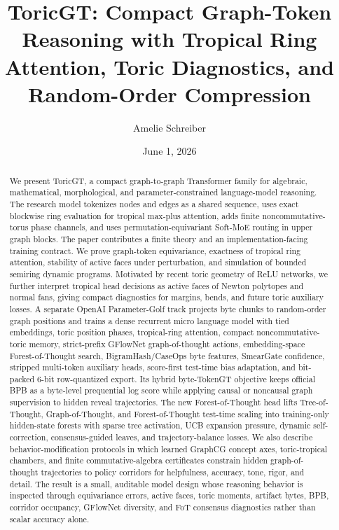 \documentclass[10pt]{article}
\title{\vspace{-1.4em}ToricGT: Compact Graph-Token Reasoning with Tropical Ring Attention, Toric Diagnostics, and Random-Order Compression}
\author{Amelie Schreiber}
\date{June 1, 2026}
\theoremstyle{definition}
\theoremstyle{plain}
\theoremstyle{remark}
\begin{document}
\maketitle

\begin{abstract}
We present ToricGT, a compact graph-to-graph Transformer family for algebraic, mathematical, morphological, and parameter-constrained language-model reasoning.  The research model tokenizes nodes and edges as a shared sequence, uses exact blockwise ring evaluation for tropical max-plus attention, adds finite noncommutative-torus phase channels, and uses permutation-equivariant Soft-MoE routing in upper graph blocks.  The paper contributes a finite theory and an implementation-facing training contract.  We prove graph-token equivariance, exactness of tropical ring attention, stability of active faces under perturbation, and simulation of bounded semiring dynamic programs.  Motivated by recent toric geometry of ReLU networks, we further interpret tropical head decisions as active faces of Newton polytopes and normal fans, giving compact diagnostics for margins, bends, and future toric auxiliary losses.  A separate OpenAI Parameter-Golf track projects byte chunks to random-order graph positions and trains a dense recurrent micro language model with tied embeddings, toric position phases, tropical-ring attention, compact noncommutative-toric memory, strict-prefix GFlowNet graph-of-thought actions, embedding-space Forest-of-Thought search, BigramHash/CaseOps byte features, SmearGate confidence, stripped multi-token auxiliary heads, score-first test-time bias adaptation, and bit-packed 6-bit row-quantized export.  Its hybrid byte-TokenGT objective keeps official BPB as a byte-level prequential log score while applying causal or noncausal graph supervision to hidden reveal trajectories.  The new Forest-of-Thought head lifts Tree-of-Thought, Graph-of-Thought, and Forest-of-Thought test-time scaling into training-only hidden-state forests with sparse tree activation, UCB expansion pressure, dynamic self-correction, consensus-guided leaves, and trajectory-balance losses.  We also describe behavior-modification protocols in which learned GraphCG concept axes, toric-tropical chambers, and finite commutative-algebra certificates constrain hidden graph-of-thought trajectories to policy corridors for helpfulness, accuracy, tone, rigor, and detail.  The result is a small, auditable model design whose reasoning behavior is inspected through equivariance errors, active faces, toric moments, artifact bytes, BPB, corridor occupancy, GFlowNet diversity, and FoT consensus diagnostics rather than scalar accuracy alone.
\end{abstract}
\end{document}
